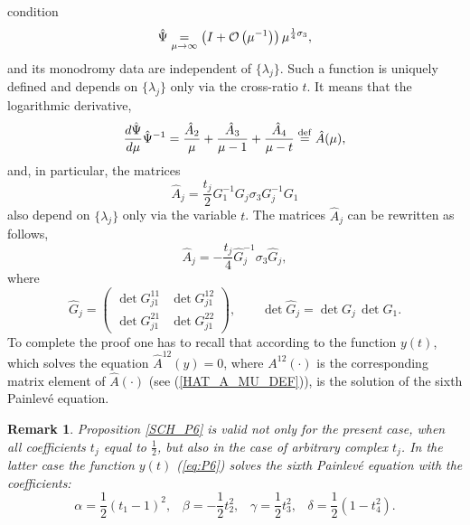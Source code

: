 \documentclass[11pt]{article}
\def\underset#1#2{\mathrel{\mathop{#2}\limits_{#1}}}
\newtheorem{remark}{Remark}[section]
\def\l{\lambda}
\def\f{\frac}
\begin{document}
condition
$$
\hat\Psi\underset{\mu\to\infty}=
\left(I+{\cal O}\left(\mu^{-1}\right)\right)\mu^{\f14\sigma_3},
$$
and its monodromy data are independent of  
$\{\l_j\}$. Such a function is uniquely defined and depends on 
$\{\l_j\}$ only via the cross-ratio $t$.
It means that the logarithmic derivative,
\begin{equation}
  \label{HAT_A_MU_DEF}
\frac{d\hat\Psi}{d\mu}\hat\Psi^{-1}=\frac{\hat A_2}\mu+\frac{\hat A_3}{\mu-1}+
\frac{\hat A_4}{\mu-t}\stackrel{{\rm def}}=\hat A(\mu),
\end{equation}
and, in particular, the matrices
$$
\hat A_j=\frac{t_j}2G_1^{-1}G_j\sigma_3G_j^{-1}G_1
$$
also depend on $\{\l_j\}$ only via the variable $t$. The matrices 
$\hat A_j$ can be rewritten as follows,
$$
\hat A_j=-\frac{t_j}4\hat G_j^{-1}\sigma_3\hat G_j, 
$$
where
\begin{equation}
  \label{eq:HAT_G_J_DEF}
  \hat G_j=\left(\begin{array}{cc}
\det G_{j1}^{11}&\det G_{j1}^{12}\\
\det G_{j1}^{21}&\det G_{j1}^{22}
\end{array}\right),\quad\quad
\det\hat G_j=\det G_j\,\det G_1.
\end{equation}
To complete the proof one has to recall that according to \cite{JM}
the function $y(t)$, which solves the equation
$\hat A^{12}(y)=0$, where $ A^{12}(\cdot)$ is the corresponding matrix
element of $\hat A(\cdot)$ (see (\ref{HAT_A_MU_DEF})), is the solution 
of the sixth Painlev\'e equation.
\vskip0.5cm
\begin{remark}\rm
Proposition \ref{SCH_P6} is valid not only for the present case, when all coefficients $t_j$ equal to $\frac 12$,
 but also in the case of arbitrary complex $t_j$. In the latter case the
function $y(t)$ (\ref{eq:P6}) solves the sixth Painlev\'e equation with the
coefficients:
$$
\alpha=\frac 12(t_1-1)^2,\;\;\;\beta=-\frac 12t_2^2,\;\;\;
\gamma=\frac 12t_3^2,\;\;\;\delta=\frac 12(1-t_4^2).
$$ 
\end{remark}
\vskip0.5cm
\end{document}

